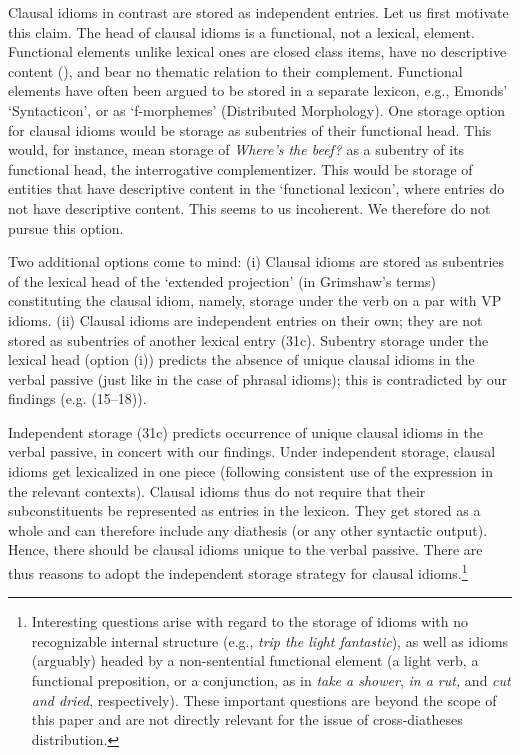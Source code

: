 \documentclass[output=paper,
modfonts
]{LSP/langsci}
\begin{document}
Clausal idioms in contrast are stored as independent entries. Let us
first motivate this claim. The head of clausal idioms is a functional,
not a lexical, element. Functional elements unlike lexical ones are
closed class items, have no descriptive content (\citealt{abney1987}), and bear
no thematic relation to their complement. Functional elements have often
been argued to be stored in a separate lexicon, e.g., Emonds' \citeyear{emonds2000}
`Syntacticon', or as `f-morphemes' (Distributed Morphology). One storage
option for clausal idioms would be storage as subentries of their
functional head. This would, for instance, mean storage of \emph{Where's
the beef?} as a subentry of its functional head, the interrogative
complementizer. This would be storage of entities that have descriptive
content in the `functional lexicon', where entries do not have
descriptive content. This seems to us incoherent. We therefore do not
pursue this option.

Two additional options come to mind: (i) Clausal idioms are stored as
subentries of the lexical head of the `extended projection' (in
Grimshaw's \citeyear{grimshaw1991} terms) constituting the clausal idiom, namely,
storage under the verb on a par with VP idioms. (ii) Clausal idioms are
independent entries on their own; they are not stored as subentries of
another lexical entry (31c). Subentry storage under the lexical head
(option (i)) predicts the absence of unique clausal idioms in the verbal
passive (just like in the case of phrasal idioms); this is contradicted
by our findings (e.g. (15--18)).

Independent storage (31c) predicts occurrence of unique clausal idioms
in the verbal passive, in concert with our findings. Under independent
storage, clausal idioms get lexicalized in one piece (following
consistent use of the expression in the relevant contexts). Clausal
idioms thus do not require that their subconstituents be represented as
entries in the lexicon. They get stored as a whole and can therefore
include any diathesis (or any other syntactic output). Hence, there
should be clausal idioms unique to the verbal passive. There are thus
reasons to adopt the independent storage strategy for clausal
idioms.\footnote{Interesting questions arise with regard to the storage
  of idioms with no recognizable internal structure (e.g., \emph{trip
  the light fantastic}), as well as idioms (arguably) headed by a
  non-sentential functional element (a light verb, a functional
  preposition, or a conjunction, as in \emph{take a shower}, \emph{in a
  rut,} and \emph{cut and dried}, respectively). These important
  questions are beyond the scope of this paper and are not directly
  relevant for the issue of cross-diatheses distribution.}
\end{document}
